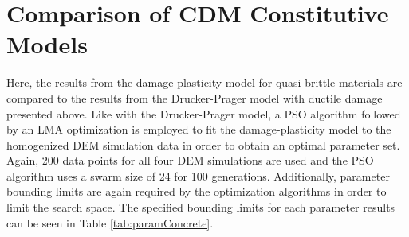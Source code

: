 \section{Comparison of CDM Constitutive Models}

Here, the results from the damage plasticity model for quasi-brittle materials are compared to the results from the Drucker-Prager model with ductile damage presented above. Like with the Drucker-Prager model, a PSO algorithm followed by an LMA optimization is employed to fit the damage-plasticity model to the homogenized DEM simulation data in order to obtain an optimal parameter set. Again, 200 data points for all four DEM simulations are used and the PSO algorithm uses a swarm size of 24 for 100 generations. Additionally, parameter bounding limits are again required by the optimization algorithms in order to limit the search space. The specified bounding limits for each parameter results can be seen in Table \ref{tab:paramConcrete}.

